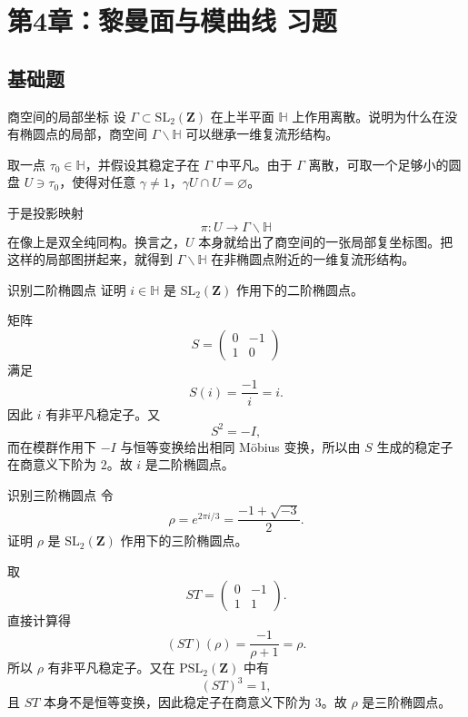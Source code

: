 \chapter{第4章：黎曼面与模曲线 习题}

\difficultykey

\section{基础题 \easy}

\begin{problem}{商空间的局部坐标}
\easy
设 $\Gamma\subset \mathrm{SL}_2(\mathbf Z)$ 在上半平面 $\mathbb H$ 上作用离散。说明为什么在没有椭圆点的局部，商空间 $\Gamma\backslash\mathbb H$ 可以继承一维复流形结构。
\end{problem}
\begin{solution}
取一点 $\tau_0\in\mathbb H$，并假设其稳定子在 $\Gamma$ 中平凡。由于 $\Gamma$ 离散，可取一个足够小的圆盘 $U\ni\tau_0$，使得对任意 $\gamma\ne 1$，$\gamma U\cap U=\varnothing$。

于是投影映射
\[
\pi:U\longrightarrow \Gamma\backslash\mathbb H
\]
在像上是双全纯同构。换言之，$U$ 本身就给出了商空间的一张局部复坐标图。把这样的局部图拼起来，就得到 $\Gamma\backslash\mathbb H$ 在非椭圆点附近的一维复流形结构。
\end{solution}

\begin{problem}{识别二阶椭圆点}
\easy
证明 $i\in\mathbb H$ 是 $\mathrm{SL}_2(\mathbf Z)$ 作用下的二阶椭圆点。
\end{problem}
\begin{solution}
矩阵
\[
S=\begin{pmatrix}0&-1\\1&0\end{pmatrix}
\]
满足
\[
S(i)=\frac{-1}{i}=i.
\]
因此 $i$ 有非平凡稳定子。又
\[
S^2=-I,
\]
而在模群作用下 $-I$ 与恒等变换给出相同 Möbius 变换，所以由 $S$ 生成的稳定子在商意义下阶为 $2$。故 $i$ 是二阶椭圆点。
\end{solution}

\begin{problem}{识别三阶椭圆点}
\easy
令
\[
\rho=e^{2\pi i/3}=\frac{-1+\sqrt{-3}}{2}.
\]
证明 $\rho$ 是 $\mathrm{SL}_2(\mathbf Z)$ 作用下的三阶椭圆点。
\end{problem}
\begin{solution}
取
\[
ST=\begin{pmatrix}0&-1\\1&1\end{pmatrix}.
\]
直接计算得
\[
(ST)(\rho)=\frac{-1}{\rho+1}=\rho.
\]
所以 $\rho$ 有非平凡稳定子。又在 $\mathrm{PSL}_2(\mathbf Z)$ 中有
\[
(ST)^3=1,
\]
且 $ST$ 本身不是恒等变换，因此稳定子在商意义下阶为 $3$。故 $\rho$ 是三阶椭圆点。
\end{solution}

